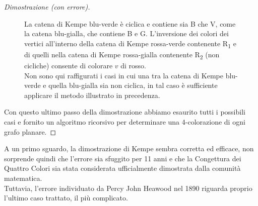 \documentclass[a4paper,12pt,titlepage]{report}
\begin{document}
\begin{proof}[Dimostrazione (con errore)]
\begin{enumerate}
\begin{description}
\begin{figure}[h!]
        		\vspace{0.5cm}
        		\caption{La catena di Kempe blu-verde è ciclica e contiene sia B che V, come la catena blu-gialla, che contiene B e G. L'inversione dei colori dei vertici all'interno della catena di Kempe rossa-verde contenente R\textsubscript{1} e di quelli nella catena di Kempe rossa-gialla contenente R\textsubscript{2} (non cicliche) consente di colorare $v$ di rosso.
        		\\Non sono qui raffigurati i casi in cui una tra la catena di Kempe blu-verde e quella blu-gialla sia non ciclica, in tal caso è sufficiente applicare il metodo illustrato in precedenza.}
        	    \end{figure}
        	\end{description}
        \end{enumerate}
        Con questo ultimo passo della dimostrazione abbiamo esaurito tutti i possibili casi e fornito un algoritmo ricorsivo per determinare una 4-colorazione di ogni grafo planare.
    \end{proof}
    \vspace{0.5cm}
    A un primo sguardo, la dimostrazione di Kempe sembra corretta ed efficace, non sorprende quindi che l'errore sia sfuggito per 11 anni e che la Congettura dei Quattro Colori sia stata considerata ufficialmente dimostrata dalla comunità matematica.
    \\Tuttavia, l'errore individuato da Percy John Heawood nel 1890 riguarda proprio l'ultimo caso trattato, il più complicato.
\end{document}
